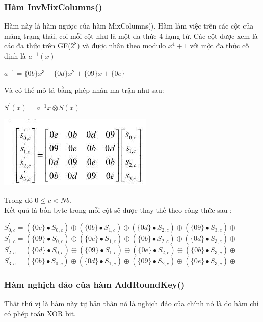 \documentclass[paper=a4, fontsize=11pt]{scrartcl}	%
\numberwithin{equation}{section}															%
\numberwithin{figure}{section}																%
\numberwithin{table}{section}																%
\begin{document}
		\subsubsection{Hàm InvMixColumns()}
		Hàm này là hàm ngược của hàm MixColumns(). Hàm làm việc trên các cột của mảng trạng thái, coi mỗi cột như là một đa thức 4 hạng tử. Các cột được xem là các đa thức trên GF($2^8$) và được nhân theo modulo $x^4 +1$ với một đa thức cố định là $a^{-1}(x)$
		\begin{center}
		$a^{-1} = \{0b\}x^3 +\{0d\}x^2 + \{09\}x + \{0e\}$
		\end{center}
		Và có thể mô tả bằng phép nhân ma trận như sau:
		\begin{center}
		$S^{'}(x) = a^{-1}x \otimes S(x)$
		\end{center}
		\begin{center}
		\includegraphics[scale=0.6]{AESMixColume}
		\end{center}
		Trong đó $0 \le c < Nb$.\\
		Kết quả là bốn byte trong mỗi cột sẽ được thay thế theo công thức sau :
		\begin{center}
		$S^{'}_{0,c}=(\{0e\} \bullet S_{0,c})\oplus (\{0b\} \bullet S_{1,c})\oplus (\{0d\} \bullet S_{2,c})\oplus (\{09\} \bullet S_{3,c})\oplus$ \\
		$S^{'}_{1,c}=(\{09\} \bullet S_{0,c})\oplus (\{0e\} \bullet S_{1,c})\oplus (\{0b\} \bullet S_{2,c})\oplus (\{0d\} \bullet S_{3,c})\oplus$ \\
		$S^{'}_{2,c}=(\{0d\} \bullet S_{0,c})\oplus (\{09\} \bullet S_{1,c})\oplus (\{0e\} \bullet S_{2,c})\oplus (\{0b\} \bullet S_{3,c})\oplus$ \\
		$S^{'}_{3,c}=(\{0b\} \bullet S_{0,c})\oplus (\{0d\} \bullet S_{1,c})\oplus (\{09\} \bullet S_{2,c})\oplus (\{0e\} \bullet S_{3,c})\oplus$ 
		\end{center}
		\subsubsection{Hàm nghịch đảo của hàm AddRoundKey()}
		Thật thú vị là hàm này tự bản thân nó là nghịch đảo của chính nó là do hàm chỉ có phép toán XOR bit.
		\newpage
\end{document}
